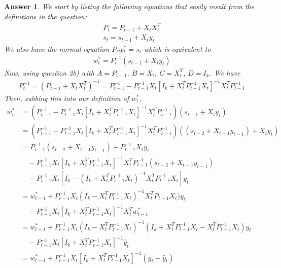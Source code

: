 \documentclass[12pt]{article}
\theoremstyle{colon}
\newtheorem*{answer}{Answer}
\begin{document}
\begin{answer}
  We start by listing the following equations that easily result from the definitions in the question:
  \begin{gather*}
    P_t = P_{t-1} + X_t X_t^T \\
    s_t = s_{t-1} + X_t y_t
  \end{gather*}
  We also have the normal equation $P_t w_t^* = s_t$ which is equivalent to
  \begin{gather*}
    w_t^* = P_t^{-1} (s_{t-1} + X_t y_t)
  \end{gather*}
  Now, using question 2b) with $A = P_{t-1}$, $B = X_t$, $C = X_t^T$, $D = I_k$. We have
  \begin{gather*}
    P_t^{-1} = (P_{t-1} + X_t X_t^T)^{-1} = P_{t-1}^{-1} - P_{t-1}^{-1} X_t [I_k + X_t^T P_{t-1}^{-1} X_t]^{-1} X_t^T P_{t-1}^{-1}
  \end{gather*}
  Then, subbing this into our definition of $w_t^*$,
  \begin{align*}
    w_t^* &= (P_{t-1}^{-1} - P_{t-1}^{-1} X_t [I_k + X_t^T P_{t-1}^{-1} X_t]^{-1} X_t^T P_{t-1}^{-1} )(s_{t-1} + X_t y_t) \\
    &= (P_{t-1}^{-1} - P_{t-1}^{-1} X_t [I_k + X_t^T P_{t-1}^{-1} X_t]^{-1} X_t^T P_{t-1}^{-1}) ((s_{t-2} + X_{t-1} y_{t-1}) + X_t y_t) \\
    &= P_{t-1}^{-1}(s_{t-2} + X_{t-1} y_{t-1}) + P_{t-1}^{-1} X_t y_t \\
    &\quad - P_{t-1}^{-1} X_t [I_k + X_t^T P_{t-1}^{-1} X_t]^{-1} X_t^T P_{t-1}^{-1}(s_{t-2} + X_{t-1} y_{t-1}) \\
    &\quad - P_{t-1}^{-1} X_t [I_k - (I_k + X_t^T P_{t-1}^{-1} X_t)^{-1} X_t^T P_{t-1}^{-1} X_t] y_t \\
    &= w_{t-1}^* + P_{t-1}^{-1} X_t (I_k - X_t^T P_{t-1}^{-1} X_t)^{-1} X_t^T P_{t-1} X_t) y_t \\
    &\quad - P_{t-1}^{-1} X_t [I_k + X_t^T P_{t-1}^{-1} X_t]^{-1} X_t^T w_{t-1}^* \\
    &= w_{t-1}^* + P_{t-1}^{-1} X_t (I_k - X_t^T P_{t-1}^{-1} X_t)^{-1}(I_k + X_t^T P_{t-1}^{-1} X_t - X_t^T P_{t-1}^{-1} X_t) y_t \\
    &\quad - P_{t-1}^{-1} X_t [I_k + X_t^T P_{t-1}^{-1} X_t]^{-1} \hat{y}_t \\
    &= w_{t-1}^* + P_{t-1}^{-1} X_t [I_k + X_t^T P_{t-1}^{-1} X_t]^{-1} (y_t - \hat{y}_t)
  \end{align*}
\end{answer}

\clearpage
\end{document}
